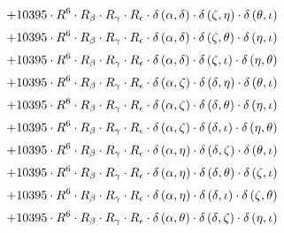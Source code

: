\begin{subequations}
\begin{gather}
 \\[0.2em] \notag 		 + 10395 \cdot R^{6} \cdot R_{\beta{}} \cdot R_{\gamma{}} \cdot R_{\epsilon{}} \cdot \delta{}\left(\alpha{}, \delta{}\right) \cdot \delta{}\left(\zeta{}, \eta{}\right) \cdot \delta{}\left(\theta{}, \iota{}\right) 
 \\[0.2em] \notag 		 + 10395 \cdot R^{6} \cdot R_{\beta{}} \cdot R_{\gamma{}} \cdot R_{\epsilon{}} \cdot \delta{}\left(\alpha{}, \delta{}\right) \cdot \delta{}\left(\zeta{}, \theta{}\right) \cdot \delta{}\left(\eta{}, \iota{}\right) 
 \\[0.2em] \notag 		 + 10395 \cdot R^{6} \cdot R_{\beta{}} \cdot R_{\gamma{}} \cdot R_{\epsilon{}} \cdot \delta{}\left(\alpha{}, \delta{}\right) \cdot \delta{}\left(\zeta{}, \iota{}\right) \cdot \delta{}\left(\eta{}, \theta{}\right) 
 \\[0.2em] \notag 		 + 10395 \cdot R^{6} \cdot R_{\beta{}} \cdot R_{\gamma{}} \cdot R_{\epsilon{}} \cdot \delta{}\left(\alpha{}, \zeta{}\right) \cdot \delta{}\left(\delta{}, \eta{}\right) \cdot \delta{}\left(\theta{}, \iota{}\right) 
 \\[0.2em] \notag 		 + 10395 \cdot R^{6} \cdot R_{\beta{}} \cdot R_{\gamma{}} \cdot R_{\epsilon{}} \cdot \delta{}\left(\alpha{}, \zeta{}\right) \cdot \delta{}\left(\delta{}, \theta{}\right) \cdot \delta{}\left(\eta{}, \iota{}\right) 
 \\[0.2em] \notag 		 + 10395 \cdot R^{6} \cdot R_{\beta{}} \cdot R_{\gamma{}} \cdot R_{\epsilon{}} \cdot \delta{}\left(\alpha{}, \zeta{}\right) \cdot \delta{}\left(\delta{}, \iota{}\right) \cdot \delta{}\left(\eta{}, \theta{}\right) 
 \\[0.2em] \notag 		 + 10395 \cdot R^{6} \cdot R_{\beta{}} \cdot R_{\gamma{}} \cdot R_{\epsilon{}} \cdot \delta{}\left(\alpha{}, \eta{}\right) \cdot \delta{}\left(\delta{}, \zeta{}\right) \cdot \delta{}\left(\theta{}, \iota{}\right) 
 \\[0.2em] \notag 		 + 10395 \cdot R^{6} \cdot R_{\beta{}} \cdot R_{\gamma{}} \cdot R_{\epsilon{}} \cdot \delta{}\left(\alpha{}, \eta{}\right) \cdot \delta{}\left(\delta{}, \theta{}\right) \cdot \delta{}\left(\zeta{}, \iota{}\right) 
 \\[0.2em] \notag 		 + 10395 \cdot R^{6} \cdot R_{\beta{}} \cdot R_{\gamma{}} \cdot R_{\epsilon{}} \cdot \delta{}\left(\alpha{}, \eta{}\right) \cdot \delta{}\left(\delta{}, \iota{}\right) \cdot \delta{}\left(\zeta{}, \theta{}\right) 
 \\[0.2em] \notag 		 + 10395 \cdot R^{6} \cdot R_{\beta{}} \cdot R_{\gamma{}} \cdot R_{\epsilon{}} \cdot \delta{}\left(\alpha{}, \theta{}\right) \cdot \delta{}\left(\delta{}, \zeta{}\right) \cdot \delta{}\left(\eta{}, \iota{}\right) 

\end{gather}
\end{subequations}
